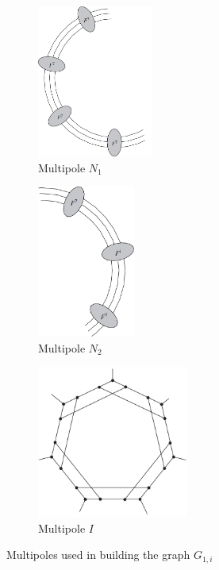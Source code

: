 \documentclass[12pt, twoside]{book}
\begin{document}
\begin{example}
	\begin{figure}
		\centering
		\begin{subfigure}[b]{0.32\textwidth}
			\centering
			\includegraphics[height=5cm, width=\textwidth, keepaspectratio]{images/Gi-first-multipole}
			\caption{Multipole $N_1$}
			\label{fig:Gi-first-multipole}
		\end{subfigure}
		\hfill
		\begin{subfigure}[b]{0.32\textwidth}
			\centering
			\includegraphics[height=5cm, width=\textwidth, keepaspectratio]{images/Gi-second-multipole}
			\caption{Multipole $N_2$}
			\label{fig:Gi-second-multipole}
		\end{subfigure}
		\hfill
		\begin{subfigure}[b]{0.32\textwidth}
			\centering
			\includegraphics[height=5cm, width=\textwidth, keepaspectratio]{images/Gi-inner-multipole}
			\caption{Multipole $I$}
			\label{fig:Gi-inner-multipole}
		\end{subfigure}
		\caption{Multipoles used in building the graph $G_{1,i}$}
	\end{figure}


\end{example}
\end{document}
